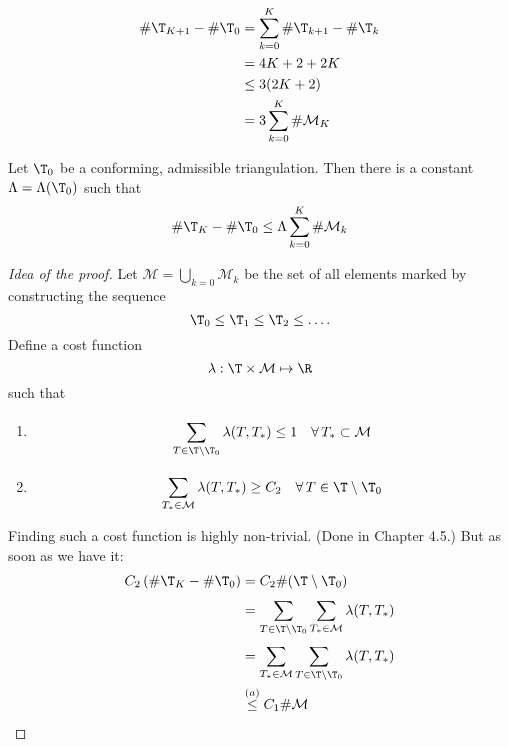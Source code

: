 \begin{enumerate}[label = \alph*)]
		\begin{align*}
			\# \T_{K+1} - \# \T_{0} &= \sum\limits_{k=0}^{K} \# \T_{k+1} - \# \T_{k}\\
									&= 4K + 2 + 2K\\
									&\leq 3( 2K +2 )\\
									&= 3 \sum\limits_{k=0}^{K} \#\mathcal{M}_{K} 
		\end{align*}
		\begin{theorem}
			Let $\T_{0}$ be a conforming, admissible triangulation. Then there is a constant $\Lambda = \Lambda(\T_{0})$ such that 
			\begin{equation*}
				\# \T_{K} - \# \T_{0} \leq \Lambda \sum\limits_{k=0}^{K} \#\mathcal{M}_{k}
			\end{equation*}
		\end{theorem}
    \begin{proof}[Idea of the proof]
			Let $\mathcal{M} = \bigcup_{k=0} \mathcal{M}_{k}$ be the set of all elements marked by constructing the sequence
			 \begin{equation*}
				\T_{0} \leq \T_{1} \leq \T_{2}\leq \dots .
			\end{equation*}
			Define a cost function
			\begin{equation*}
				\lambda: \T \times \mathcal{M} \mapsto \R
			\end{equation*}
			such that
			\begin{enumerate}[label = \alph*)]
				\item 
					\begin{equation*}
						\sum\limits_{T \in \T\setminus \T_{0}}^{} \lambda(T,T_{*}) \leq 1 \quad \forall \, T_{*} \subset \mathcal{M}
					\end{equation*}
				\item 
					\begin{equation*}
						\sum\limits_{T_{*}\in \mathcal{M}}^{} \lambda(T,T_{*}) \geq C_{2} \quad \forall \, T \in \T \setminus \T_{0}
					\end{equation*}
			\end{enumerate}
      Finding such a cost function is highly non-trivial. (Done in Chapter 4.5.) %
      But as soon as we have it:
			\begin{align*}
				C_{2} \left( \# \T_{K} - \# \T_{0} \right) &= C_{2}\# (\T\setminus \T_{0}) \\
														   &= \sum\limits_{T \in \T \setminus \T_{0} }^{} \sum\limits_{T_{*} \in \mathcal{M}}^{} \lambda(T,T_{*})\\
														   &= \sum\limits_{T_{*} \in \mathcal{M}}^{} \sum\limits_{T \in \T \setminus \T_{0} }^{} \lambda(T,T_{*})\\
														   &\overset{(a)}{\leq} C_{1} \# \mathcal{M}
			\end{align*}
		\end{proof}
\end{enumerate}

